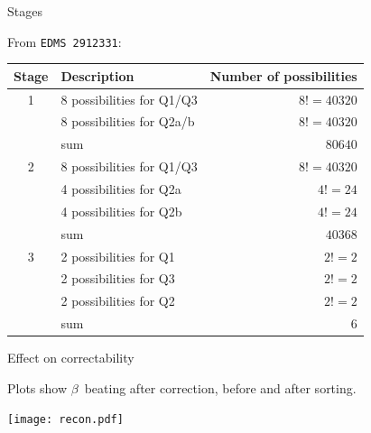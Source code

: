\documentclass[usenames,dvipsnames,aspectratio=169,table]{beamer}
\begin{document}
\begin{frame} %
    {Stages}

    From \texttt{EDMS 2912331}:\\[0.5em]

    \begin{tabular}{c|l|r}
        \textbf{Stage} & \textbf{Description} & \textbf{Number of possibilities}\\
        \hline
        1 & 8 possibilities for Q1/Q3 & $8! = 40320$\\
          & 8 possibilities for Q2a/b & $8! = 40320$\\
          \hline 
          & sum                       & $80640$\\
          \hline 
          \hline 
        2 & 8 possibilities for Q1/Q3 & $8! = 40320$\\
          & 4 possibilities for Q2a   & $4! = 24$\\
          & 4 possibilities for Q2b   & $4! = 24$\\
          \hline 
          & sum                       & $40368$\\
          \hline 
          \hline 
        3 & 2 possibilities for Q1   & $2! = 2$\\
          & 2 possibilities for Q3   & $2! = 2$\\
          & 2 possibilities for Q2   & $2! = 2$\\
          \hline 
          & sum                       & $6$\\
          \hline 
          \hline 
    \end{tabular}
\end{frame} %

\begin{frame} %
    {Effect on correctability}


    Plots show $\beta$~beating after correction, before and after sorting.
    
    \begin{center}
        \texttt{[image: recon.pdf]}
    \end{center}

\end{frame} %
\end{document}
